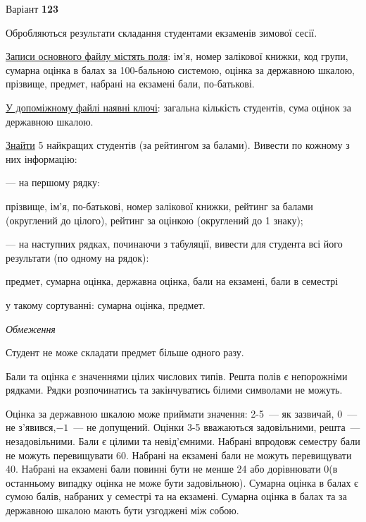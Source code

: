 \documentclass[11pt, ukrainian]{article}
\begin{document}
\par
\newpage
{\center Варіант  \No \textbf { 123 }\par}
\bigskip
Обробляються результати складання студентами екзаменів зимової сесії.

\underline{Записи основного файлу містять поля}: ім’я, номер залікової книжки, код групи, сумарна оцінка в балах за 100-бальною системою, оцінка за державною шкалою, прізвище, предмет, набрані на екзамені бали, по-батькові.

\underline{У допоміжному файлі наявні ключі}: загальна кількість студентів, сума оцінок за державною шкалою.

\underline{Знайти} 5 найкращих студентів (за рейтингом за балами). Вивести по кожному з них інформацію:\par
{\noindent}--- на першому рядку:\par
прізвище, ім’я, по-батькові, номер залікової книжки, рейтинг за балами (округлений до цілого), рейтинг за оцінкою (округлений до 1 знаку);

{\noindent}--- на наступних рядках, починаючи з табуляції, вивести для студента всі його результати (по одному на рядок):\par
предмет, сумарна оцінка, державна оцінка, бали на екзамені, бали в семестрі

{\noindent}у такому сортуванні: сумарна оцінка, предмет.


\bigskip\textit{Обмеження}

Студент не може складати предмет більше одного разу.

Бали та оцінка є значеннями цілих числових типів. Решта полів є непорожніми рядками.
Рядки розпочинатись та закінчуватись білими символами не можуть.

Оцінка за державною шкалою може приймати значення: 2-5~--- як зазвичай, 0~--- не з’явився,$-1$~--- не допущений. 
Оцінки 3-5 вважаються задовільними, решта~--- незадовільними. 
Бали є цілими та невід’ємними.
Набрані впродовж семестру бали не можуть перевищувати 60. 
Набрані на екзамені бали не можуть перевищувати 40. 
Набрані на екзамені бали повинні бути не менше 24 або дорівнювати 0(в останньому випадку оцінка не може бути задовільною). 
Сумарна оцінка в балах є сумою балів, набраних у семестрі та на екзамені.
Сумарна оцінка в балах та за державною шкалою мають бути узгоджені між собою.
\end{document}
